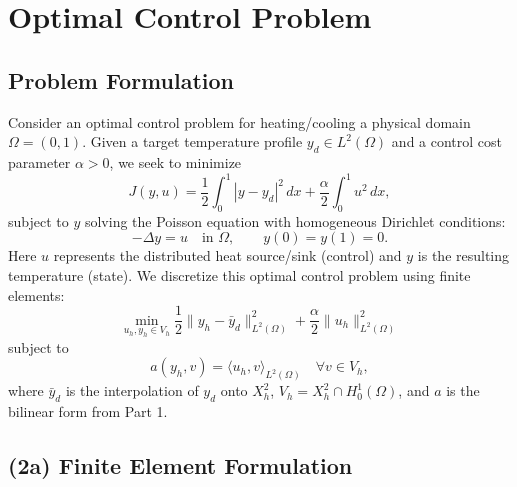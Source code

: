 \documentclass[a4paper,10pt]{article}
\begin{document}
\section{Optimal Control Problem}
\subsection{Problem Formulation}

Consider an optimal control problem for heating/cooling a physical domain $\Omega=(0,1)$. 
Given a target temperature profile $y_d \in L^2(\Omega)$ and a control cost parameter $\alpha > 0$, we seek to minimize
$$ 
J(y,u) = \frac{1}{2}\int_0^1 |y-y_d|^2\,dx + \frac{\alpha}{2}\int_0^1 u^2\,dx, 
$$
subject to $y$ solving the Poisson equation with homogeneous Dirichlet conditions:
$$ 
-\Delta y = u \quad\text{in }\Omega, \qquad y(0) = y(1) = 0.
$$
Here $u$ represents the distributed heat source/sink (control) and $y$ is the resulting temperature (state).
We discretize this optimal control problem using finite elements:
\[ 
\min_{u_h,y_h\in V_h} \frac{1}{2}\|y_h - \bar{y}_d\|^2_{L^2(\Omega)} + \frac{\alpha}{2}\|u_h\|^2_{L^2(\Omega)}
\]
subject to
\[
a(y_h,v) = \langle u_h,v \rangle_{L^2(\Omega)} \quad\forall v\in V_h, 
\]
where $\bar{y}_d$ is the interpolation of $y_d$ onto $X^2_h$, $V_h = X^2_h \cap H^1_0(\Omega)$, and $a$ is the bilinear form from Part 1.

\subsection{(2a) Finite Element Formulation}
\end{document}
